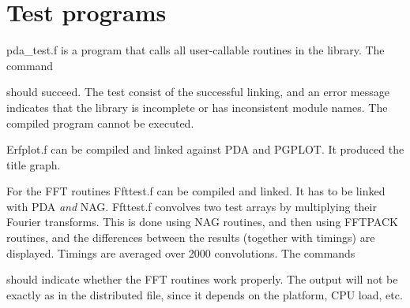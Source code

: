 \documentclass[11pt,twoside,nolof]{starlink}
\begin{document}

\section{Test programs}

   pda\_test.f is a program that calls all user-callable routines in the
   library. The command

\begin{terminalv}
\end{terminalv}

   should succeed. The test consist of the successful linking, and an
   error message indicates that the library is incomplete or has
   inconsistent module names. The compiled program cannot be executed.

   Erfplot.f can be compiled and linked against PDA and PGPLOT. It
   produced the title graph.

\begin{terminalv}
\end{terminalv}

   For the FFT routines Ffttest.f can be compiled and linked. It has to
   be linked with PDA \emph{and\/} NAG. Ffttest.f convolves two
   test arrays by multiplying their Fourier transforms. This is done
   using NAG routines, and then using FFTPACK routines, and the
   differences between the results (together with timings) are
   displayed. Timings are averaged over 2000 convolutions. The commands

\begin{terminalv}
\end{terminalv}

   should indicate whether the FFT routines work properly. The output
   will not be exactly as in the distributed file, since it depends on
   the platform, CPU load, etc.
\end{document}
